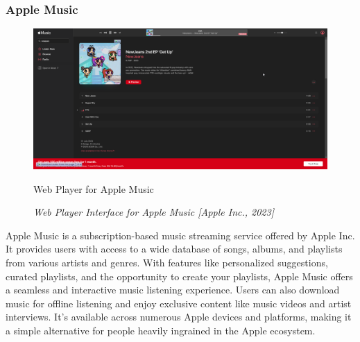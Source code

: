 \subsubsection{Apple Music}
\begin{figure}[h]
    \centering
    \includegraphics[width=1.0\linewidth]{mainmatter/images/musicplat1.png}
    \caption{Web Player for Apple Music}
    \caption*{\textit{Web Player Interface for Apple Music [Apple Inc., 2023]}}
    \label{fig:myfig6}
\end{figure}
Apple Music is a subscription-based music streaming service offered by Apple Inc. It provides users with access to a wide database of songs, albums, and playlists from various artists and genres. With features like personalized suggestions, curated playlists, and the opportunity to create your playlists, Apple Music offers a seamless and interactive music listening experience. Users can also download music for offline listening and enjoy exclusive content like music videos and artist interviews. It's available across numerous Apple devices and platforms, making it a simple alternative for people heavily ingrained in the Apple ecosystem. \pagebreak

